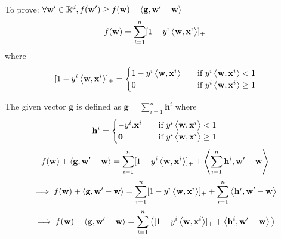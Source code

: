 \documentclass[a4paper,11pt]{article}
\begin{document}
\begin{mlsolution}
To prove: $\forall \mathbf{w'} \in \mathbb{R}^d, f(\mathbf{w'}) \geq f(\mathbf{w}) + \left\langle{\mathbf{g}},{\mathbf{w'-w}}\right\rangle$
\[
	f(\mathbf{w}) = \sum_{i=1}^{n}[1 - y^i \left\langle{\mathbf{w}},{\mathbf{x}^i}\right\rangle]_{+}
\]
where
\[
	[1 - y^i \left\langle{\mathbf{w}},{\mathbf{x}^i}\right\rangle]_{+} = 
     \begin{cases}
       1 - y^i \left\langle{\mathbf{w}},{\mathbf{x}^i}\right\rangle &\quad\text{if }y^i \left\langle{\mathbf{w}},{\mathbf{x}^i}\right\rangle < 1\\
       0 &\quad\text{if }y^i \left\langle{\mathbf{w}},{\mathbf{x}^i}\right\rangle \geq 1\\
     \end{cases}
\]

The given vector $\mathbf{g}$ is defined as $\mathbf{g} = \sum_{i=1}^{n}\mathbf{h}^i$ where 
\[
	\mathbf{h}^i = 
     \begin{cases}
      -y^i . \mathbf{x}^i  &\quad\text{if }y^i \left\langle{\mathbf{w}},{\mathbf{x}^i}\right\rangle < 1\\
       \mathbf{0}                          &\quad\text{if }y^i \left\langle{\mathbf{w}},{\mathbf{x}^i}\right\rangle \geq 1\\
     \end{cases}
\]
\[ f(\mathbf{w}) + \left\langle{\mathbf{g}},{\mathbf{w'-w}}\right\rangle = \sum_{i=1}^{n}[1 - y^i \left\langle{\mathbf{w}},{\mathbf{x}^i}\right\rangle]_{+} + \left\langle{\sum_{i=1}^{n}\mathbf{h}^i},{\mathbf{w'-w}}\right\rangle \]
\[ \implies f(\mathbf{w}) + \left\langle{\mathbf{g}},{\mathbf{w'-w}}\right\rangle = \sum_{i=1}^{n}[1 - y^i \left\langle{\mathbf{w}},{\mathbf{x}^i}\right\rangle]_{+} + \sum_{i=1}^{n}\left\langle{\mathbf{h}^i},{\mathbf{w'-w}}\right\rangle \]
\[ \implies f(\mathbf{w}) + \left\langle{\mathbf{g}},{\mathbf{w'-w}}\right\rangle = \sum_{i=1}^{n}\big([1 - y^i \left\langle{\mathbf{w}},{\mathbf{x}^i}\right\rangle]_{+} +\left\langle{\mathbf{h}^i},{\mathbf{w'-w}}\right\rangle\big) \]


\end{mlsolution}
\end{document}

